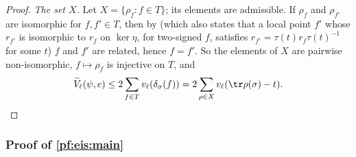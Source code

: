 \begin{proof}
\emph{The set $X$.} Let $X=\{\rho_f:f\in T\}$; its elements are admissible. If $\rho_f$ and $\rho_{f'}$ are isomorphic for $f,f'\in T$,
then by  (which also states that a local point $f'$ whose $r_{f'}$ is isomorphic to $r_f$ on
$\ker\eta$, for two-signed $f$, satisfies $r_{f'}=\tau(t)r_f\tau(t)^{-1}$ for some $t$) $f$ and $f'$ are related, hence $f=f'$. So the
elements of $X$ are pairwise non-isomorphic, $f\mapsto\rho_f$ is injective on $T$, and
\[
 \eisVt_\ell(\psi,e)\le2\sum_{f\in T}\eisv(\eistr_\sigma(f))=2\sum_{\rho\in X}\eisv(\tr\rho(\sigma)-t).\qedhere
\]
\end{proof}

\subsubsection{Proof of \texorpdfstring{\cref{pf:eis:main}}{Theorem CountI}}

